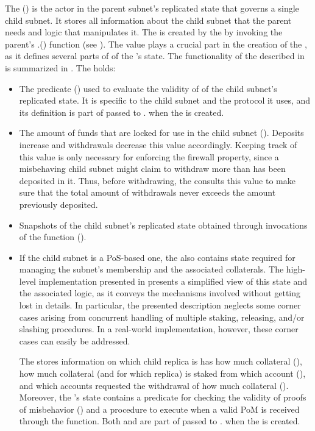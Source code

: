 The \saFull (\sa) is the actor in the parent subnet's replicated state that governs a single child subnet.
It stores all information about the child subnet that the parent needs and logic that manipulates it.
The \sa is created by the \gw by invoking the parent's \gw.() function (see ).
The  value plays a crucial part in the creation of the \sa, as it defines several parts of of the \sa's state.
The functionality of the \sa described in  is summarized in .
The \sa holds:
\begin{itemize}
    
    \item The predicate () used to evaluate the validity of \pofsFull of the child subnet's replicated state.
    It is specific to the child subnet and the protocol it uses, and its definition is part of  passed to \gw. when the \sa is created.

    \item The amount of funds that are locked for use in the child subnet ().
    Deposits increase and withdrawals decrease this value accordingly.
    Keeping track of this value is only necessary for enforcing the firewall property, since a misbehaving child subnet might claim to withdraw more than has been deposited in it.
    Thus, before withdrawing, the \sa consults this value to make sure that the total amount of withdrawals never exceeds the amount previously deposited.

    \item Snapshots of the child subnet's replicated state obtained through invocations of the  function ().

    \item If the child subnet is a PoS-based one, the \sa also contains state required for managing the subnet's membership and the associated collaterals.
    The high-level implementation presented in  presents a simplified view of this state and the associated logic, as it conveys the mechanisms involved without getting lost in details.
    In particular, the presented description neglects some corner cases arising from concurrent handling of multiple staking, releasing, and/or slashing procedures.
    In a real-world implementation, however, these corner cases can easily be addressed.

    The \sa stores information on which child replica is has how much collateral (),
    how much collateral (and for which replica) is staked from which account (),
    and which accounts requested the withdrawal of how much collateral ().
    Moreover, the \sa's state contains a predicate for checking the validity of proofs of misbehavior ()
    and a procedure to execute when a valid PoM is received through the  function.
    Both  and  are part of  passed to \gw. when the \sa is created.
    
\end{itemize}


